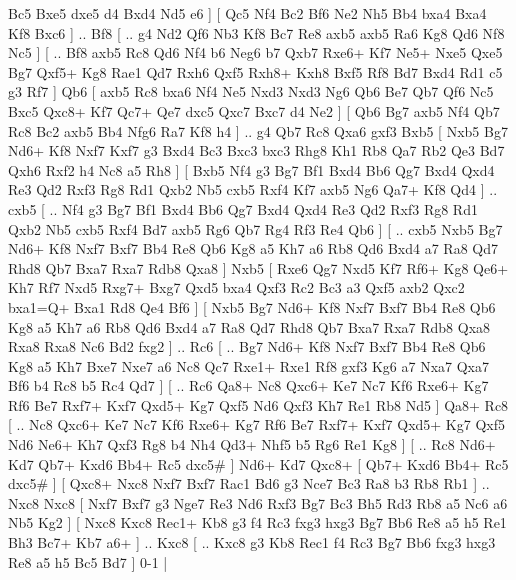  Bc5 Bxe5  dxe5 d4  Bxd4 Nd5  e6   ]  [  Qc5 Nf4  Bc2 Bf6  Ne2 Nh5  Bb4 bxa4  Bxa4 Kf8  Bxc6   ] .. Bf8 [ .. g4  Nd2 Qf6  Nb3 Kf8  Bc7 Re8  axb5 axb5  Ra6 Kg8  Qd6 Nf8  Nc5   ]  [ .. Bf8  axb5 Rc8  Qd6 Nf4  b6 Neg6  b7 Qxb7  Rxe6+ Kf7  Ne5+ Nxe5  Qxe5 Bg7  Qxf5+ Kg8  Rae1 Qd7  Rxh6 Qxf5  Rxh8+ Kxh8  Bxf5 Rf8  Bd7 Bxd4  Rd1 c5  g3 Rf7   ]  Qb6 [  axb5 Rc8  bxa6 Nf4  Ne5 Nxd3  Nxd3 Ng6  Qb6 Be7  Qb7 Qf6  Nc5 Bxc5  Qxc8+ Kf7  Qc7+ Qe7  dxc5 Qxc7  Bxc7 d4  Ne2   ]  [  Qb6 Bg7  axb5 Nf4  Qb7 Rc8  Bc2 axb5  Bb4 Nfg6  Ra7 Kf8  h4   ] .. g4    Qb7   Rc8    Qxa6   gxf3    Bxb5 [  Nxb5 Bg7  Nd6+ Kf8  Nxf7 Kxf7  g3 Bxd4  Bc3 Bxc3  bxc3 Rhg8  Kh1 Rb8  Qa7 Rb2  Qe3 Bd7  Qxh6 Rxf2  h4 Nc8  a5 Rh8   ]  [  Bxb5 Nf4  g3 Bg7  Bf1 Bxd4  Bb6 Qg7  Bxd4 Qxd4  Re3 Qd2  Rxf3 Rg8  Rd1 Qxb2  Nb5 cxb5  Rxf4 Kf7  axb5 Ng6  Qa7+ Kf8  Qd4   ] .. cxb5 [ .. Nf4  g3 Bg7  Bf1 Bxd4  Bb6 Qg7  Bxd4 Qxd4  Re3 Qd2  Rxf3 Rg8  Rd1 Qxb2  Nb5 cxb5  Rxf4 Bd7  axb5 Rg6  Qb7 Rg4  Rf3 Re4  Qb6   ]  [ .. cxb5  Nxb5 Bg7  Nd6+ Kf8  Nxf7 Bxf7  Bb4 Re8  Qb6 Kg8  a5 Kh7  a6 Rb8  Qd6 Bxd4  a7 Ra8  Qd7 Rhd8  Qb7 Bxa7  Rxa7 Rdb8  Qxa8   ]  Nxb5 [  Rxe6 Qg7  Nxd5 Kf7  Rf6+ Kg8  Qe6+ Kh7  Rf7 Nxd5  Rxg7+ Bxg7  Qxd5 bxa4  Qxf3 Rc2  Bc3 a3  Qxf5 axb2  Qxc2 bxa1=Q+  Bxa1 Rd8  Qe4 Bf6   ]  [  Nxb5 Bg7  Nd6+ Kf8  Nxf7 Bxf7  Bb4 Re8  Qb6 Kg8  a5 Kh7  a6 Rb8  Qd6 Bxd4  a7 Ra8  Qd7 Rhd8  Qb7 Bxa7  Rxa7 Rdb8  Qxa8 Rxa8  Rxa8 Nc6  Bd2 fxg2   ] .. Rc6 [ .. Bg7  Nd6+ Kf8  Nxf7 Bxf7  Bb4 Re8  Qb6 Kg8  a5 Kh7  Bxe7 Nxe7  a6 Nc8  Qc7 Rxe1+  Rxe1 Rf8  gxf3 Kg6  a7 Nxa7  Qxa7 Bf6  b4 Rc8  b5 Rc4  Qd7   ]  [ .. Rc6  Qa8+ Nc8  Qxc6+ Ke7  Nc7 Kf6  Rxe6+ Kg7  Rf6 Be7  Rxf7+ Kxf7  Qxd5+ Kg7  Qxf5 Nd6  Qxf3 Kh7  Re1 Rb8  Nd5   ]  Qa8+   Rc8 [ .. Nc8  Qxc6+ Ke7  Nc7 Kf6  Rxe6+ Kg7  Rf6 Be7  Rxf7+ Kxf7  Qxd5+ Kg7  Qxf5 Nd6  Ne6+ Kh7  Qxf3 Rg8  b4 Nh4  Qd3+ Nhf5  b5 Rg6  Re1 Kg8   ]  [ .. Rc8  Nd6+ Kd7  Qb7+ Kxd6  Bb4+ Rc5  dxc5#   ]  Nd6+   Kd7   Qxc8+    [  Qb7+ Kxd6  Bb4+ Rc5  dxc5#   ]  [  Qxc8+ Nxc8  Nxf7 Bxf7  Rac1 Bd6  g3 Nce7  Bc3 Ra8  b3 Rb8  Rb1   ] .. Nxc8    Nxc8 [  Nxf7 Bxf7  g3 Nge7  Re3 Nd6  Rxf3 Bg7  Bc3 Bh5  Rd3 Rb8  a5 Nc6  a6 Nb5  Kg2   ]  [  Nxc8 Kxc8  Rec1+ Kb8  g3 f4  Rc3 fxg3  hxg3 Bg7  Bb6 Re8  a5 h5  Re1 Bh3  Bc7+ Kb7  a6+   ] .. Kxc8    [ .. Kxc8  g3 Kb8  Rec1 f4  Rc3 Bg7  Bb6 fxg3  hxg3 Re8  a5 h5  Bc5 Bd7   ] 0-1  |
